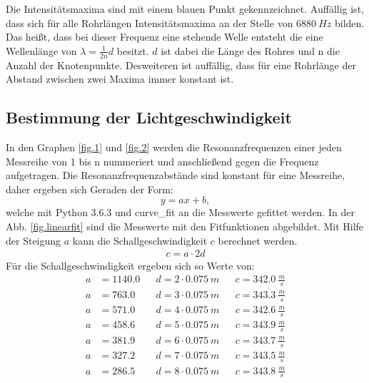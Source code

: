Die Intensitätsmaxima sind mit einem blauen Punkt gekennzeichnet.
Auffällig ist, dass sich für alle Rohrlängen Intensitätsmaxima an der Stelle von $\SI{6880}{Hz}$ bilden. Das heißt, dass bei dieser Frequenz eine stehende Welle entsteht die eine Wellenlänge von $\lambda=\frac{1}{2n}d$ besitzt.
$d$ ist dabei die Länge des Rohres und n die Anzahl der Knotenpunkte.
Desweiteren ist auffällig, dass für eine Rohrlänge der Abstand zwischen zwei Maxima immer konstant ist.
\FloatBarrier

\subsection{Bestimmung der Lichtgeschwindigkeit}
\FloatBarrier
In den Graphen \ref{fig.1} und \ref{fig.2} %
werden die Resonanzfrequenzen einer jeden Messreihe von 1 bis n nummeriert und anschließend gegen die Frequenz aufgetragen.
Die Resonanzfrequenzabstände sind konstant für eine Messreihe, daher ergeben sich Geraden der Form:
\begin{equation*}
  y=ax+b,
\end{equation*}
welche mit Python 3.6.3 und curve\_fit an die Messwerte gefittet werden.
In der Abb. \ref{fig.linearfit} sind die Messwerte mit den Fitfunktionen abgebildet.
Mit Hilfe der Steigung $a$ kann die Schallgeschwindigkeit $c$ berechnet werden.
\begin{align*}
  c = a\cdot2d
\end{align*}
Für die Schallgeschwindigkeit ergeben sich so Werte von:
\begin{align*}
a &= 1140.0 && d = 2\cdot\SI{0.075}{m} && c=\SI{342.0}{\frac{m}{s}}\\
a &= 763.0  && d = 3\cdot\SI{0.075}{m} && c=\SI{343.3}{\frac{m}{s}}\\
a &= 571.0  && d = 4\cdot\SI{0.075}{m} && c=\SI{342.6}{\frac{m}{s}}\\
a &= 458.6  && d = 5\cdot\SI{0.075}{m} && c=\SI{343.9}{\frac{m}{s}}\\
a &= 381.9  && d = 6\cdot\SI{0.075}{m} && c=\SI{343.7}{\frac{m}{s}}\\
a &= 327.2  && d = 7\cdot\SI{0.075}{m} && c=\SI{343.5}{\frac{m}{s}}\\
a &= 286.5  && d = 8\cdot\SI{0.075}{m} && c=\SI{343.8}{\frac{m}{s}}\\
\end{align*}
